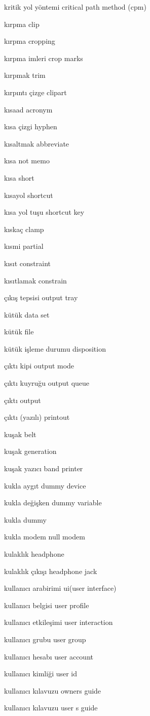 \documentclass[12pt,fleqn]{article}\usepackage{../../common}
\begin{document}
kritik yol yöntemi critical path method (cpm)

kırpma clip

kırpma cropping

kırpma imleri crop marks

kırpmak trim

kırpıntı çizge clipart

kısaad acronym

kısa çizgi hyphen

kısaltmak abbreviate

kısa not memo

kısa short

kısayol shortcut

kısa yol tuşu shortcut key

kıskaç clamp

kısmi partial

kısıt constraint

kısıtlamak constrain

çıkış tepsisi output tray

kütük data set

kütük file

kütük işleme durumu disposition

çıktı kipi output mode

çıktı kuyruğu output queue

çıktı output

çıktı (yazılı) printout

kuşak belt

kuşak generation

kuşak yazıcı band printer

kukla aygıt dummy device

kukla değişken dummy variable

kukla dummy

kukla modem null modem

kulaklık headphone

kulaklık çıkışı headphone jack

kullanıcı arabirimi ui(user interface)

kullanıcı belgisi user profile

kullanıcı etkileşimi user interaction

kullanıcı grubu user group

kullanıcı hesabı user account

kullanıcı kimliği user id

kullanıcı kılavuzu owners guide

kullanıcı kılavuzu user s guide
\end{document}

